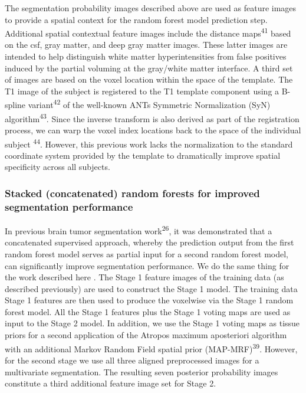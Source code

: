 \documentclass[11pt,]{article}
\begin{document}
The segmentation probability images described above are used as feature
images to provide a spatial context for the random forest model
prediction step. Additional spatial contextual feature images include
the distance maps\textsuperscript{41} based on the csf, gray matter, and
deep gray matter images. These latter images are intended to help
distinguish white matter hyperintensities from false positives induced
by the partial voluming at the gray/white matter interface. A third set
of images are based on the voxel location within the space of the
template. The T1 image of the subject is registered to the T1 template
component using a B-spline variant\textsuperscript{42} of the well-known
ANTs Symmetric Normalization (SyN) algorithm\textsuperscript{43}. Since
the inverse transform is also derived as part of the registration
process, we can warp the voxel index locations back to the space of the
individual subject
\textsuperscript{44}. However, this previous work lacks the
normalization to the standard coordinate system provided by the template
to dramatically improve spatial specificity across all subjects.

\subsubsection{Stacked (concatenated) random forests for improved
segmentation
performance}\label{stacked-concatenated-random-forests-for-improved-segmentation-performance}

In previous brain tumor segmentation work\textsuperscript{26}, it was
demonstrated that a concatenated supervised approach, whereby the
prediction output from the first random forest model serves as partial
input for a second random forest model, can significantly improve
segmentation performance. We do the same thing for the work described
here
.
The Stage 1 feature images of the training data (as described
previously) are used to construct the Stage 1 model. The training data
Stage 1 features are then used to produce the voxelwise
via the Stage 1 random forest model. All the Stage 1 features plus the
Stage 1 voting maps are used as input to the Stage 2 model. In addition,
we use the Stage 1 voting maps as tissue priors
for a second application of the Atropos maximum aposteriori algorithm
with an additional Markov Random Field spatial prior
(MAP-MRF)\textsuperscript{39}. However, for the second stage we use all
three aligned preprocessed images for a multivariate segmentation. The
resulting seven posterior probability images constitute a third
additional feature image set for Stage 2.
\end{document}
